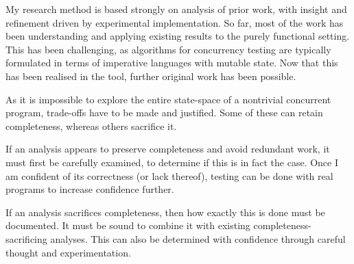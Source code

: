 My research method is based strongly on analysis of prior work, with
insight and refinement driven by experimental implementation. So far,
most of the work has been understanding and applying existing results
to the purely functional setting. This has been challenging, as
algorithms for concurrency testing are typically formulated in terms
of imperative languages with mutable state. Now that this has been
realised in the \dejafu{} tool, further original work has been
possible.

As it is impossible to explore the entire state-space of a nontrivial
concurrent program, trade-offs have to be made and justified. Some of
these can retain completeness, whereas others sacrifice it.

If an analysis appears to preserve completeness and avoid redundant
work, it must first be carefully examined, to determine if this is in
fact the case. Once I am confident of its correctness (or lack
thereof), testing can be done with real programs to increase
confidence further.

If an analysis sacrifices completeness, then how exactly this is done
must be documented. It must be sound to combine it with existing
completeness-sacrificing analyses. This can also be determined with
confidence through careful thought and experimentation.
